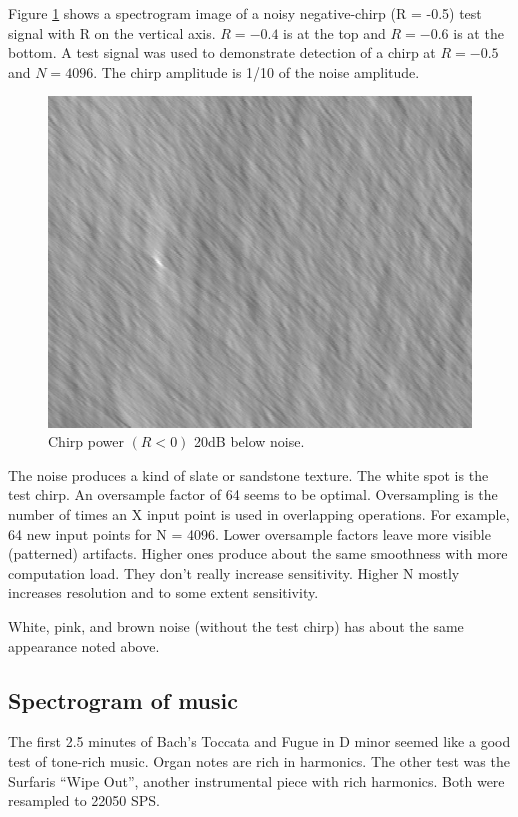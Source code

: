 Figure \ref{fig:chirpTest1} shows a spectrogram image of a noisy
negative-chirp (R = -0.5) test signal with R on the vertical axis.
$R=-0.4$ is at the top and $R=-0.6$ is at the bottom.
A test signal was used to demonstrate detection of a chirp at
$R=-0.5$ and $N=4096$.
The chirp amplitude is 1/10 of the noise amplitude.
\begin{figure}
  \includegraphics[width=\linewidth]{../source/chirp42m.jpg}
  \caption{Chirp power $(R<0)$ 20dB below noise.}
  \label{fig:chirpTest1}
\end{figure}

The noise produces a kind of slate or sandstone texture.
The white spot is the test chirp.
An oversample factor of 64 seems to be optimal.
Oversampling is the number of times an X input point is used in overlapping
operations. For example, 64 new input points for N = 4096.
Lower oversample factors leave more visible (patterned) artifacts.
Higher ones produce about the same smoothness with more computation load.
They don't really increase sensitivity.
Higher N mostly increases resolution and to some extent sensitivity.

White, pink, and brown noise (without the test chirp) has about the same 
appearance noted above.

\subsection{Spectrogram of music}

The first 2.5 minutes of Bach's Toccata and Fugue in D minor seemed like a good
test of tone-rich music. Organ notes are rich in harmonics.
The other test was the Surfaris ``Wipe Out'', another instrumental piece with
rich harmonics. Both were resampled to 22050 SPS.

